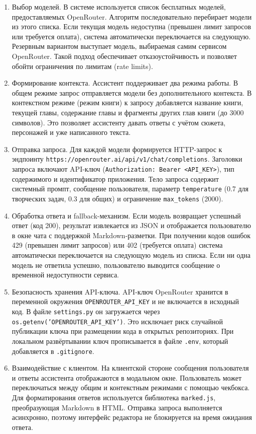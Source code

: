 \begin{enumerate}
    \item Выбор моделей. В системе используется список бесплатных моделей, предоставляемых OpenRouter. Алгоритм последовательно перебирает модели из этого списка. Если текущая модель недоступна (превышен лимит запросов или требуется оплата), система автоматически переключается на следующую. Резервным вариантом выступает модель, выбираемая самим сервисом OpenRouter. Такой подход обеспечивает отказоустойчивость и позволяет обойти ограничения по лимитам (rate limits).
    
    \item Формирование контекста. Ассистент поддерживает два режима работы. В общем режиме запрос отправляется модели без дополнительного контекста. В контекстном режиме (режим книги) к запросу добавляется название книги, текущей главы, содержание главы и фрагменты других глав книги (до 3000 символов). Это позволяет ассистенту давать ответы с учётом сюжета, персонажей и уже написанного текста.
    
    \item Отправка запроса. Для каждой модели формируется HTTP-запрос к эндпоинту \texttt{https://openrouter.ai/api/v1/chat/completions}. Заголовки запроса включают API-ключ (\texttt{Authorization: Bearer <API\_KEY>}), тип содержимого и идентификатор приложения. Тело запроса содержит системный промпт, сообщение пользователя, параметр \texttt{temperature} (0.7 для творческих задач, 0.3 для общих) и ограничение \texttt{max\_tokens} (2000).
    
    \item Обработка ответа и fallback-механизм. Если модель возвращает успешный ответ (код 200), результат извлекается из JSON и отображается пользователю в окне чата с поддержкой Markdown-разметки. При получении кодов ошибок 429 (превышен лимит запросов) или 402 (требуется оплата) система автоматически переключается на следующую модель из списка. Если ни одна модель не ответила успешно, пользователю выводится сообщение о временной недоступности сервиса.
    
    \item Безопасность хранения API-ключа. API-ключ OpenRouter хранится в переменной окружения \texttt{OPENROUTER\_API\_KEY} и не включается в исходный код. В файле \texttt{settings.py} он загружается через \texttt{os.getenv('OPENROUTER\_API\_KEY')}. Это исключает риск случайной публикации ключа при размещении кода в открытых репозиториях. При локальном развёртывании ключ прописывается в файле \texttt{.env}, который добавляется в \texttt{.gitignore}.
    
    \item Взаимодействие с клиентом. На клиентской стороне сообщения пользователя и ответы ассистента отображаются в модальном окне. Пользователь может переключаться между общим и контекстным режимами с помощью чекбокса. Для форматирования ответов используется библиотека \texttt{marked.js}, преобразующая Markdown в HTML. Отправка запроса выполняется асинхронно, поэтому интерфейс редактора не блокируется на время ожидания ответа.
\end{enumerate}

